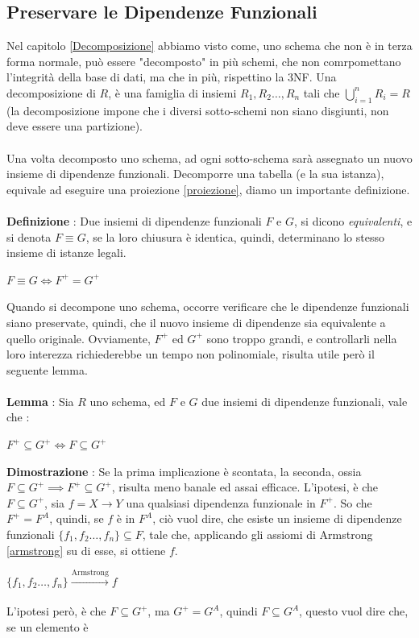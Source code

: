 \documentclass[12pt, letterpaper]{article}
\newcommand{\acc}{\\\hphantom{}\\}
\begin{document}
\subsection{Preservare le Dipendenze Funzionali}
Nel capitolo \ref{Decomposizione} abbiamo visto come, uno schema che non è in terza forma normale, può essere "decomposto" in più 
schemi, che non comrpomettano l'integrità della base di dati, ma che in più, rispettino la 3NF. Una decomposizione di \(R\), è una 
famiglia di insiemi \(R_1,R_2\dots,R_n\) tali che \(\displaystyle\bigcup_{i=1}^nR_i=R\) (la decomposizione impone che i 
diversi sotto-schemi non siano disgiunti, non deve essere una partizione).\acc Una volta decomposto uno schema, ad ogni 
sotto-schema sarà assegnato un nuovo insieme di dipendenze funzionali. Decomporre una tabella (e la sua istanza), equivale 
ad eseguire una proiezione \ref{proiezione}, diamo un importante definizione.\acc 
\textbf{Definizione }: Due insiemi di dipendenze funzionali \(F\) e \(G\), si dicono \textit{equivalenti}, e si 
denota \(F\equiv G\), se la loro chiusura è identica, quindi, determinano lo stesso insieme di istanze legali.\begin{center}
    \(F\equiv G\iff F^+=G^+\)
\end{center} 
Quando si decompone uno schema, occorre verificare che le dipendenze funzionali siano preservate, quindi, che il nuovo insieme 
di dipendenze sia equivalente a quello originale. Ovviamente, \(F^+\) ed \(G^+\) sono troppo grandi, e controllarli nella loro 
interezza richiederebbe un tempo non polinomiale, risulta utile però il seguente lemma.\acc 
\textbf{Lemma }: Sia \(R\) uno schema, ed \(F\) e \(G\) due insiemi di dipendenze funzionali, vale che :\begin{center}
    \(F^+\subseteq G^+\iff F\subseteq G^+\)
\end{center}
\textbf{Dimostrazione} : Se la prima implicazione è scontata, la seconda, ossia \(F\subseteq G^+\implies F^+\subseteq G^+\), risulta meno banale ed 
assai efficace. L'ipotesi, è che \(F\subseteq G^+\), sia \(f=X\rightarrow Y\) una qualsiasi dipendenza funzionale in \(F^+\). 
So che \(F^+=F^A\), quindi, se \(f\) è in \(F^A\), ciò vuol dire, che esiste un insieme di dipendenze funzionali 
\(\{f_1,f_2\dots,f_n\}\subseteq F\), tale che, applicando gli assiomi di Armstrong \ref{armstrong} su di esse, si ottiene \(f\).\begin{center}
    \(\{f_1,f_2\dots,f_n\}\xrightarrow[\text{}]{\text{Armstrong}}f\)
\end{center}
L'ipotesi però, è che \(F\subseteq G^+\), ma \(G^+=G^A\), quindi \(F\subseteq G^A\), questo vuol dire che, se un elemento è 
\end{document}
